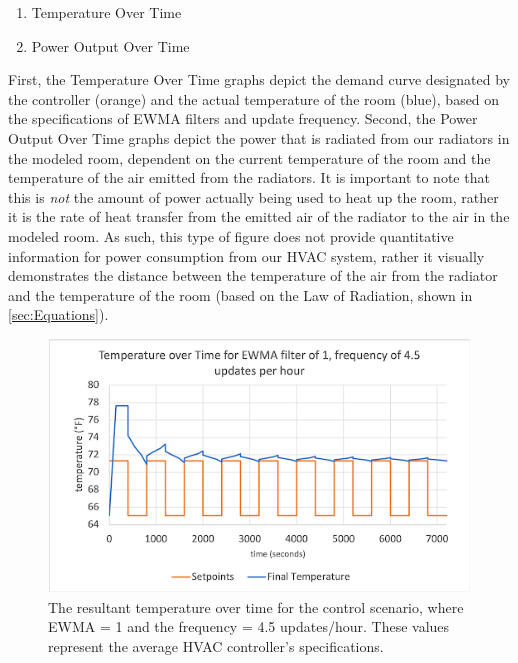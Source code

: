 \documentclass[conference,letterpaper]{IEEEtran}
\begin{document}
\begin{enumerate}
\item Temperature Over Time
\item Power Output Over Time
\end{enumerate}

    First, the Temperature Over Time graphs depict the demand curve designated by the controller (orange) and the actual temperature of the room (blue), based on the specifications of EWMA filters and update frequency.
    Second, the Power Output Over Time graphs depict the power that is radiated from our radiators in the modeled room, dependent on the current temperature of the room and the temperature of the air emitted from the radiators. It is important to note that this is \textit{not} the amount of power actually being used to heat up the room, rather it is the rate of heat transfer from the emitted air of the radiator to the air in the modeled room. As such, this type of figure does not provide quantitative information for power consumption from our HVAC system, rather it visually demonstrates the distance between the temperature of the air from the radiator and the temperature of the room (based on the Law of Radiation, shown in \ref{sec:Equations}).
\begin{figure}[H]
    \includegraphics[scale=0.48]{tempcontrol.png}
    \caption{The resultant temperature over time for the control scenario, where EWMA = 1 and the frequency = 4.5 updates/hour. These values represent the average HVAC controller's specifications.}
\end{figure}
\end{document}
